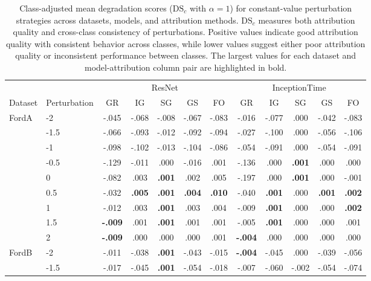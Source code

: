 \begin{table}[!htbp]
\caption{Class-adjusted mean degradation scores ($\text{DS}_c$ with $\alpha=1$) for constant-value perturbation strategies across datasets, models, and attribution methods.
$\text{DS}_c$ measures both attribution quality and cross-class consistency of perturbations.
Positive values indicate good attribution quality with consistent behavior across classes, while lower values suggest either poor attribution quality or inconsistent performance between classes.
The largest values for each dataset and model-attribution column pair are highlighted in bold.}
\label{tab:adjusted_ds_constant}
\setlength{\tabcolsep}{0pt}
\begin{tabular*}{\textwidth}{@{\extracolsep{\fill}} llcccccccccc @{}}
\toprule
 & & \multicolumn{5}{c}{ResNet} & \multicolumn{5}{c}{InceptionTime} \\
\cmidrule(lr){3-7} \cmidrule(lr){8-12}
Dataset & Perturbation & GR & IG & SG & GS & FO & GR & IG & SG & GS & FO \\
\midrule
\multirow[t]{7}{*}{FordA} & -2 & -.045 & -.068 & -.008 & -.067 & -.083 & -.016 & -.077 & .000 & -.042 & -.083 \\
 & -1.5 & -.066 & -.093 & -.012 & -.092 & -.094 & -.027 & -.100 & .000 & -.056 & -.106 \\
 & -1 & -.098 & -.102 & -.013 & -.104 & -.086 & -.054 & -.091 & .000 & -.054 & -.091 \\
 & -0.5 & -.129 & -.011 & .000 & -.016 & .001 & -.136 & .000 & \textbf{.001} & .000 & .000 \\
 & 0 & -.082 & .003 & \textbf{.001} & .002 & .005 & -.197 & .000 & \textbf{.001} & .000 & -.001 \\
 & 0.5 & -.032 & \textbf{.005} & \textbf{.001} & \textbf{.004} & \textbf{.010} & -.040 & \textbf{.001} & .000 & \textbf{.001} & \textbf{.002} \\
 & 1 & -.012 & .003 & \textbf{.001} & .003 & .004 & -.009 & \textbf{.001} & .000 & .000 & \textbf{.002} \\
 & 1.5 & \textbf{-.009} & .001 & \textbf{.001} & .001 & .001 & -.005 & \textbf{.001} & .000 & .000 & .001 \\
 & 2 & \textbf{-.009} & .000 & .000 & .000 & .001 & \textbf{-.004} & .000 & .000 & .000 & .000 \\
\cline{1-12}
\multirow[t]{7}{*}{FordB} & -2 & -.011 & -.038 & \textbf{.001} & -.043 & -.015 & \textbf{-.004} & -.045 & .000 & -.039 & -.056 \\
 & -1.5 & -.017 & -.045 & \textbf{.001} & -.054 & -.018 & -.007 & -.060 & -.002 & -.054 & -.074 \\

\end{tabular*}
\end{table}
